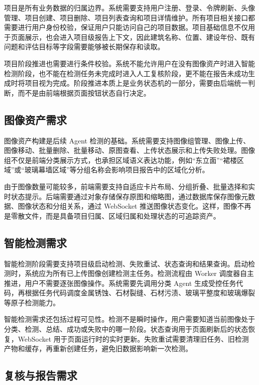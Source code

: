 项目是所有业务数据的归属边界。系统需要支持用户注册、登录、令牌刷新、头像管理、项目创建、项目删除、项目列表查询和项目详情维护。所有项目相关接口都需要进行用户身份校验，保证用户只能访问自己的项目数据。项目基础信息不仅用于页面展示，也会进入项目级报告上下文，因此建筑名称、位置、建设年份、既有问题和评估目标等字段需要能够被长期保存和读取。

项目阶段推进也需要进行条件校验。系统不能允许用户在没有图像资产时进入智能检测阶段，也不能在检测任务未完成时进入人工复核阶段，更不能在报告未成功生成时将项目视为完成。阶段推进本质上是业务状态机的一部分，需要由后端统一判断，而不是由前端根据页面按钮状态自行决定。

\subsection{图像资产需求}
\label{subsec:requirements-image-asset-requirement}

图像资产构建是后续 Agent 检测的基础。系统需要支持图像组管理、图像上传、图像移动、批量删除、批量移动、原图查看、上传状态展示和上传失败处理。图像组不仅是前端分类展示方式，也承担区域语义表达功能，例如“东立面”“裙楼区域”或“玻璃幕墙区域”等分组名称会影响项目报告中的区域化分析。

由于图像数量可能较多，前端需要支持自适应卡片布局、分组折叠、批量选择和实时状态提示。后端需要通过对象存储保存原图和缩略图，通过数据库保存图像元数据、图像状态和分组关系，通过 WebSocket 推送图像状态变化。这样，图像不再是零散文件，而是具备项目归属、区域归属和处理状态的可追踪资产。

\subsection{智能检测需求}
\label{subsec:requirements-intelligent-detection-requirement}

智能检测阶段需要支持项目级启动检测、失败重试、状态查询和结果查询。启动检测时，系统应为所有已上传图像创建检测主任务。检测流程由 Worker 调度器自主推进，用户不需要逐张图像操作。系统需要先调用分类 Agent 生成受控任务代码，再根据任务代码调度金属锈蚀、石材裂缝、石材污渍、玻璃平整度和玻璃爆裂等原子检测能力。

智能检测需求还包括过程可见性。检测不是瞬时操作，用户需要知道当前图像处于分类、检测、总结、成功或失败中的哪一阶段。状态查询用于页面刷新后的状态恢复，WebSocket 用于页面运行时的实时更新。失败重试需要清理旧任务、旧检测产物和缓存，再重新创建任务，避免旧数据影响新一次检测。

\subsection{复核与报告需求}
\label{subsec:requirements-review-and-report-requirement}

